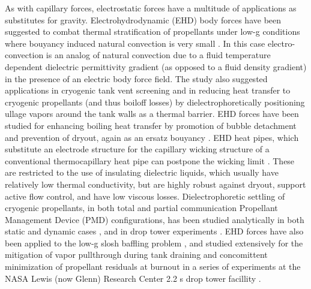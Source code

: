 \documentclass[12pt,a4paper,oneside]{book}
\begin{document}
As with capillary forces, electrostatic forces have a multitude of applications as substitutes for gravity. Electrohydrodynamic (EHD) body forces have been suggested to combat thermal stratification of propellants under low-g conditions where bouyancy induced natural convection is very small \cite{blackmon_collection_1965}. In this case electro-convection is an analog of natural convection due to a fluid temperature dependent dielectric permittivity gradient (as opposed to a fluid density gradient) in the presence of an electric body force field. The study also suggested applications in cryogenic tank vent screening and in reducing heat transfer to cryogenic propellants (and thus boiloff losses) by dielectrophoretically positioning ullage vapors around the tank walls as a thermal barrier. EHD forces have been studied for enhancing boiling heat transfer by promotion of bubble detachment and prevention of dryout, again as an ersatz bouyancy \cite{snyder_dielectrophoresis_2001, di_marco_influence_2003, marco_use_2012}. EHD heat pipes, which substitute an electrode structure for the capillary wicking structure of a conventional thermocapillary heat pipe can postpone the wicking limit \cite{jones_electrohydrodynamic_1973}. These are restricted to the use of insulating dielectric liquids, which usually have relatively low thermal conductivity, but are highly robust against dryout, support active flow control, and have low viscous losses. Dielectrophoretic settling of cryogenic propellants, in both total and partial communication Propellant Management Device (PMD) configurations, has been studied analytically in both static \cite{hurwitz_electrohydrodynamic_1966} and dynamic cases \cite{koval_dynamics_1967}, and in drop tower experiments \cite{fax_dielectrophoretic_1969}. EHD forces have also been applied to the low-g slosh baffling problem \cite{boretz_orbital_1970, petrash_use_1968, hurwitz_dielectrophoretic_1968}, and studied extensively for the mitigation of vapor pullthrough during tank draining and concomittent minimization of propellant residuals at burnout in a series of experiments at the NASA Lewis (now Glenn) Research Center 2.2 s drop tower facillity \cite{berenyi_dielectrophoretic_1970}. 
\end{document}
